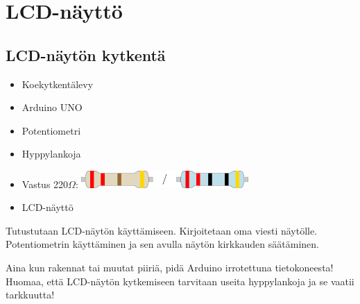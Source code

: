 \chapter{LCD-näyttö}
\section{LCD-näytön kytkentä}\label{sec:lcd}

\begin{minipage}{0.5\textwidth}
\begin{tcolorbox}[colback=lime!10,title=Tarvikkeet, colbacktitle=green!10,coltitle=black]
\begin{itemize}
    \item Koekytkentälevy
    \item Arduino UNO 
    \item Potentiometri
    \item Hyppylankoja
    \item Vastus 220$\Omega$: \includegraphics[width=0.5\textwidth]{kuvat/220.pdf}
    \item LCD-näyttö
\end{itemize}
\end{tcolorbox}
\end{minipage}
\begin{minipage}{0.5\textwidth}
\begin{tcolorbox}[colback=blue!10,title=Piirin toiminta,colbacktitle=purple!90]
Tutustutaan LCD-näytön käyttämiseen. Kirjoitetaan oma viesti näytölle. Potentiometrin käyttäminen ja sen avulla näytön kirkkauden säätäminen.
\end{tcolorbox}
\end{minipage}

\begin{tcolorbox}[colback=red!10,colbacktitle=red,title=HUOM!]
Aina kun rakennat tai muutat piiriä, pidä Arduino irrotettuna tietokoneesta! 
\tcblower
Huomaa, että LCD-näytön kytkemiseen tarvitaan useita hyppylankoja ja se vaatii tarkkuutta!
\end{tcolorbox}

